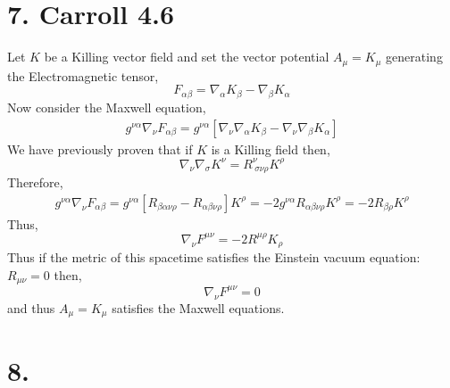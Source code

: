 \documentclass[12pt]{article}
\begin{document}
\section*{7. Carroll 4.6 }

Let $K$ be a Killing vector field and set the vector potential $A_\mu = K_\mu$ generating the Electromagnetic tensor,
\[ F_{\alpha \beta} = \nabla_\alpha K_\beta - \nabla_\beta K_\alpha \] Now consider the Maxwell equation,
\begin{align*}
g^{\nu \alpha} \nabla_\nu F_{\alpha \beta} = g^{\nu \alpha} [\nabla_\nu \nabla_\alpha K_\beta - \nabla_\nu \nabla_\beta K_\alpha] 
\end{align*}
We have previously proven that if $K$ is a Killing field then,
\[ \nabla_\nu \nabla_\sigma K^\nu = R^\nu_{\: \sigma \nu \rho} K^\rho \]
Therefore,
\begin{align*}
g^{\nu \alpha} \nabla_\nu F_{\alpha \beta} = g^{\nu \alpha} [ R_{\beta \alpha \nu \rho}  - R_{\alpha \beta \nu \rho} ] K^\rho = -2 g^{\nu \alpha} R_{\alpha \beta \nu \rho} K^\rho = - 2 R_{\beta \rho} K^\rho
\end{align*}
Thus,
\[ \nabla_\nu F^{\mu \nu} = - 2 R^{\mu \rho} K_\rho \]
Thus if the metric of this spacetime satisfies the Einstein vacuum equation: $R_{\mu \nu} = 0$ then,
\[ \nabla_\nu F^{\mu \nu} = 0 \]
and thus $A_\mu = K_\mu$ satisfies the Maxwell equations. 

\section*{8. }
\end{document}
